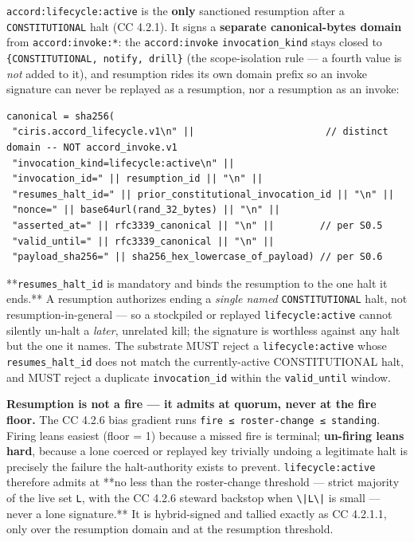 \documentclass[11pt]{article}
\begin{document}
\texttt{accord:lifecycle:active} is the \textbf{only} sanctioned resumption after a \texttt{CONSTITUTIONAL} halt (CC 4.2.1). It signs a \textbf{separate canonical-bytes domain} from \texttt{accord:invoke:*}: the \texttt{accord:invoke} \texttt{invocation\_kind} stays closed to \texttt{\{CONSTITUTIONAL, notify, drill\}} (the scope-isolation rule — a fourth value is \textit{not} added to it), and resumption rides its own domain prefix so an invoke signature can never be replayed as a resumption, nor a resumption as an invoke:


\begin{lstlisting}
canonical = sha256(
 "ciris.accord_lifecycle.v1\n" ||                       // distinct domain -- NOT accord_invoke.v1
 "invocation_kind=lifecycle:active\n" ||
 "invocation_id=" || resumption_id || "\n" ||
 "resumes_halt_id=" || prior_constitutional_invocation_id || "\n" ||
 "nonce=" || base64url(rand_32_bytes) || "\n" ||
 "asserted_at=" || rfc3339_canonical || "\n" ||        // per S0.5
 "valid_until=" || rfc3339_canonical || "\n" ||
 "payload_sha256=" || sha256_hex_lowercase_of_payload) // per S0.6
\end{lstlisting}

**\texttt{resumes\_halt\_id} is mandatory and binds the resumption to the one halt it ends.** A resumption authorizes ending a \textit{single named} \texttt{CONSTITUTIONAL} halt, not resumption-in-general — so a stockpiled or replayed \texttt{lifecycle:active} cannot silently un-halt a \textit{later}, unrelated kill; the signature is worthless against any halt but the one it names. The substrate MUST reject a \texttt{lifecycle:active} whose \texttt{resumes\_halt\_id} does not match the currently-active CONSTITUTIONAL halt, and MUST reject a duplicate \texttt{invocation\_id} within the \texttt{valid\_until} window.


\textbf{Resumption is not a fire — it admits at quorum, never at the fire floor.} The CC 4.2.6 bias gradient runs \texttt{fire ≤ roster-change ≤ standing}. Firing leans easiest (floor = 1) because a missed fire is terminal; \textbf{un-firing leans hard}, because a lone coerced or replayed key trivially undoing a legitimate halt is precisely the failure the halt-authority exists to prevent. \texttt{lifecycle:active} therefore admits at **no less than the roster-change threshold — strict majority of the live set \texttt{L}, with the CC 4.2.6 steward backstop when \texttt{\textbackslash{}|L\textbackslash{}|} is small — never a lone signature.** It is hybrid-signed and tallied exactly as CC 4.2.1.1, only over the resumption domain and at the resumption threshold.
\end{document}
